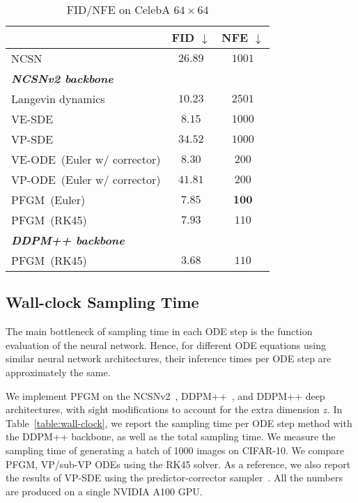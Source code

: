 \begin{table}[htbp]
\begin{center}
\caption{FID/NFE on CelebA $64 \times 64$}\label{tab:celeba}
\begin{tabular}{l c c}
\toprule
      &FID $\downarrow$ & NFE $\downarrow$\\
     \midrule
NCSN~\citep{Song2019GenerativeMB} & $26.89$  & $1001$\\
     \midrule
    \textit{\textbf{NCSNv2 backbone}}\\
    \midrule
    Langevin dynamics~\citep{Song2020ImprovedTF} & $10
    .23$  & $2501$\\
    VE-SDE~\citep{Song2021ScoreBasedGM} & $8.15$ & $1000$\\
    VP-SDE~\citep{Song2021ScoreBasedGM} &$34.52$ & $1000$\\
    \midrule
VE-ODE~(Euler w/ corrector)  & $8.30$  &  $200$\\
    VP-ODE~(Euler w/ corrector)  &  $41.81$ &  $200$\\
    PFGM~(Euler) &  ${7.85}$  &  $\bm{100}$\\
    PFGM~(RK45)&   ${7.93}$ & ${110}$ \\
    \midrule
    \textit{\textbf{DDPM++ backbone}}\\
    \midrule
     PFGM~(RK45) & $\bm{3.68}$ & $110$\\
     \bottomrule
\end{tabular}
\end{center}
\end{table}


\subsection{{Wall-clock Sampling Time}}

The main bottleneck of sampling time in each ODE step is the function evaluation of the neural network. Hence, for different ODE equations using similar neural network architectures, their inference times per ODE step are approximately the same.

We implement PFGM on the NCSNv2~\cite{Song2020ImprovedTF}, DDPM++~\cite{Song2021ScoreBasedGM}, and DDPM++ deep~\cite{Song2021ScoreBasedGM} architectures, with sight modifications to account for the extra dimension $z$. In Table~\ref{table:wall-clock}, we report the sampling time per ODE step method with the DDPM++ backbone, as well as the total sampling time. We measure the sampling time of generating a batch of 1000 images on CIFAR-10. We compare PFGM, VP/sub-VP ODEs using the RK45 solver. As a reference, we also report the results of VP-SDE using the predictor-corrector sampler~\cite{Song2021ScoreBasedGM}. All the numbers are produced on a single NVIDIA A100 GPU.

